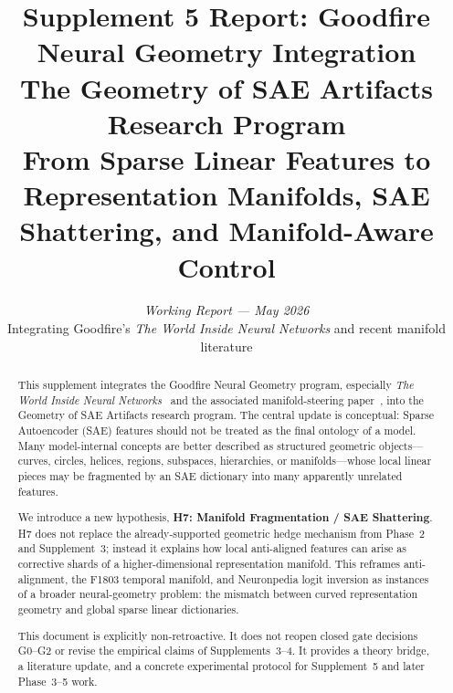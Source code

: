 \documentclass[11pt,a4paper]{article}
\title{\Large\bfseries Supplement 5 Report: Goodfire Neural Geometry Integration\\[0.4em]
\large The Geometry of SAE Artifacts Research Program\\[0.3em]
\normalsize From Sparse Linear Features to Representation Manifolds, SAE Shattering, and Manifold-Aware Control}
\author{\textit{Working Report --- May 2026}\\[0.3em]
\small Integrating Goodfire's \emph{The World Inside Neural Networks} and recent manifold literature}
\date{}
\begin{document}
\maketitle
\thispagestyle{fancy}

\begin{abstract}
\noindent This supplement integrates the Goodfire Neural Geometry program, especially \emph{The World Inside Neural Networks}~\citep{geiger2026worldinside} and the associated manifold-steering paper~\citep{wurgaft2026manifoldsteering}, into the Geometry of SAE Artifacts research program. The central update is conceptual: Sparse Autoencoder (SAE) features should not be treated as the final ontology of a model. Many model-internal concepts are better described as structured geometric objects---curves, circles, helices, regions, subspaces, hierarchies, or manifolds---whose local linear pieces may be fragmented by an SAE dictionary into many apparently unrelated features.

We introduce a new hypothesis, \textbf{H7: Manifold Fragmentation / SAE Shattering}. H7 does not replace the already-supported geometric hedge mechanism from Phase~2 and Supplement~3; instead it explains how local anti-aligned features can arise as corrective shards of a higher-dimensional representation manifold. This reframes anti-alignment, the F1803 temporal manifold, and Neuronpedia logit inversion as instances of a broader neural-geometry problem: the mismatch between curved representation geometry and global sparse linear dictionaries.

This document is explicitly non-retroactive. It does not reopen closed gate decisions G0--G2 or revise the empirical claims of Supplements~3--4. It provides a theory bridge, a literature update, and a concrete experimental protocol for Supplement~5 and later Phase~3--5 work.
\end{abstract}

\medskip\noindent{}
\end{document}
